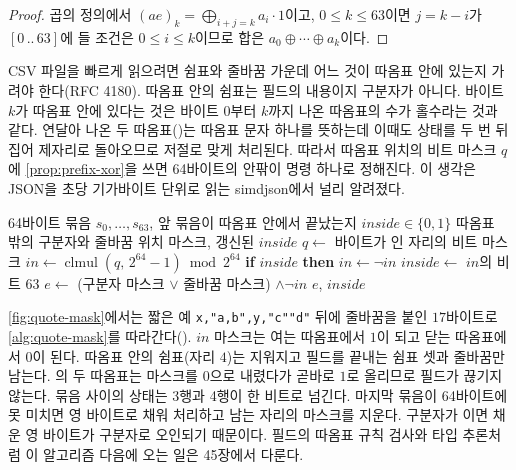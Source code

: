 \begin{proof}
곱의 정의에서 $(ae)_k=\bigoplus_{i+j=k}a_i\cdot1$이고, $0\le k\le63$이면 $j=k-i$가 $[0\,..\,63]$에 들 조건은 $0\le i\le k$이므로 합은 $a_0\oplus\cdots\oplus a_k$이다.
\end{proof}

CSV 파일을 빠르게 읽으려면 쉼표와 줄바꿈 가운데 어느 것이 따옴표 안에 있는지 가려야 한다(RFC 4180\cite{rfc4180}). 따옴표 안의 쉼표는 필드의 내용이지 구분자가 아니다. 바이트 $k$가 따옴표 안에 있다는 것은 바이트 $0$부터 $k$까지 나온 따옴표의 수가 홀수라는 것과 같다. 연달아 나온 두 따옴표()는 따옴표 문자 하나를 뜻하는데 이때도 상태를 두 번 뒤집어 제자리로 돌아오므로 저절로 맞게 처리된다. 따라서 따옴표 위치의 비트 마스크 $q$에 \cref{prop:prefix-xor}을 쓰면 64바이트의 안팎이 명령 하나로 정해진다. 이 생각은 JSON을 초당 기가바이트 단위로 읽는 simdjson에서 널리 알려졌다\cite{langdale2019simdjson}.

\begin{algorithm}[htbp]
\begin{algorithmic}[1]
\Require 64바이트 묶음 $s_0,\dots,s_{63}$, 앞 묶음이 따옴표 안에서 끝났는지 $\mathit{inside}\in\{0,1\}$
\Ensure 따옴표 밖의 구분자와 줄바꿈 위치 마스크, 갱신된 $\mathit{inside}$
\State $q\gets$ 바이트가 인 자리의 비트 마스크 
\State $\mathit{in}\gets\operatorname{clmul}(q,\,2^{64}-1)\bmod2^{64}$ 
\State \textbf{if} $\mathit{inside}$ \textbf{then} $\mathit{in}\gets\lnot\mathit{in}$ 
\State $\mathit{inside}\gets$ $\mathit{in}$의 비트 $63$
\State $e\gets$ (구분자 마스크 $\lor$ 줄바꿈 마스크) $\land\lnot\mathit{in}$ 
\State \Return $e$, $\mathit{inside}$
\end{algorithmic}
\caption{따옴표 밖의 필드 끝 찾기 (stardust CSV 읽기의 )}
\label{alg:quote-mask}
\end{algorithm}

\cref{fig:quote-mask}에서는 짧은 예 \verb|x,"a,b",y,"c""d"| 뒤에 줄바꿈을 붙인 $17$바이트로 \cref{alg:quote-mask}를 따라간다(). $\mathit{in}$ 마스크는 여는 따옴표에서 $1$이 되고 닫는 따옴표에서 $0$이 된다. 따옴표 안의 쉼표(자리 $4$)는 지워지고 필드를 끝내는 쉼표 셋과 줄바꿈만 남는다. 의 두 따옴표는 마스크를 $0$으로 내렸다가 곧바로 $1$로 올리므로 필드가 끊기지 않는다. 묶음 사이의 상태는 3행과 4행이 한 비트로 넘긴다. 마지막 묶음이 64바이트에 못 미치면 영 바이트로 채워 처리하고 남는 자리의 마스크를 지운다. 구분자가 이면 채운 영 바이트가 구분자로 오인되기 때문이다. 필드의 따옴표 규칙 검사와 타입 추론처럼 이 알고리즘 다음에 오는 일은 45장에서 다룬다.

